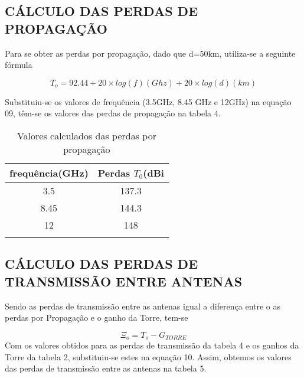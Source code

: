 \documentclass[a4paper,12pt]{article}
\begin{document}
\subsection{CÁLCULO DAS PERDAS DE PROPAGAÇÃO}
Para se obter as perdas por propagação, dado que d=50km, utiliza-se a
seguinte fórmula

\begin{equation}
 T_o = 92.44 + 20 \times log(f)(Ghz) + 20 \times log(d)(km)
 \end{equation}

 Substituiu-se os valores de frequência (3.5GHz, 8.45 GHz e 12GHz) na equação 09,
têm-se os valores das perdas de propagação na tabela 4.

\begin{table}[!h]
  \begin{center}
    \caption{Valores calculados das perdas por propagação} 
    \begin{tabular}{p{3in} p{3in}}\hline \hline 
      \multicolumn{1}{c}{frequência(GHz)} & \multicolumn{1}{c}{Perdas $T_0$(dBi}\\ \hline
      \multicolumn{1}{c}{3.5} & \multicolumn{1}{c}{137.3} \\ 
      \multicolumn{1}{c}{8.45} & \multicolumn{1}{c}{144.3} \\ 
      \multicolumn{1}{c}{12} & \multicolumn{1}{c}{148}\\ \hline
      &
    \end{tabular}
  \end{center}
\end{table}

\subsection{CÁLCULO DAS PERDAS DE TRANSMISSÃO ENTRE ANTENAS}

Sendo as perdas de transmissão entre as antenas igual a diferença entre o
as perdas por Propagação e o ganho da Torre, tem-se

\begin{equation}
\Xi_o = T_o - G_{TORRE} 
\end{equation}
Com os valores obtidos para as perdas de transmissão da tabela 4 e os ganhos da
Torre da tabela 2, substituiu-se estes na equação 10. Assim, obtemos os valores
das perdas de transmissão entre as antenas na tabela 5.
\end{document}
